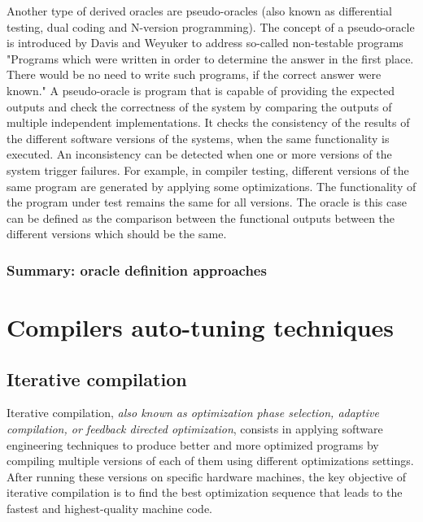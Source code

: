 \begin{itemize}
	
	
	Another type of derived oracles are pseudo-oracles (also known as differential testing, dual coding and N-version programming). 
	The concept of a pseudo-oracle is introduced by Davis and Weyuker\cite{davis1981pseudo} to address so-called non-testable programs "Programs which were written in order to determine the answer in the first place. There would be no need to write such programs, if the correct answer were known."
	A pseudo-oracle is program that is capable of providing the expected outputs and check the correctness of the system by comparing the outputs of multiple independent implementations. 
	It checks the consistency of the results of the different software versions of the systems, when the same functionality is executed. An inconsistency can be detected when one or more versions of the system trigger failures. 
	For example, in compiler testing, different versions of the same program are generated by applying some optimizations. The functionality of the program under test remains the same for all versions. The oracle is this case can be defined as the comparison between the functional outputs between the different versions which should be the same\cite{yang2011finding}.
	
	
\end{itemize}


\subsubsection{Summary: oracle definition approaches}


\section{Compilers auto-tuning techniques}

\subsection{Iterative compilation}
Iterative compilation, \textit{also known as optimization phase selection, adaptive compilation, or feedback directed optimization}\cite{triantafyllis2003compiler}, consists in applying software engineering techniques to produce better and more optimized programs by compiling multiple versions of each of them using different optimizations settings. After running these versions on specific hardware machines, the key objective of iterative compilation is to find the best optimization sequence that leads to the fastest and highest-quality machine code. 


